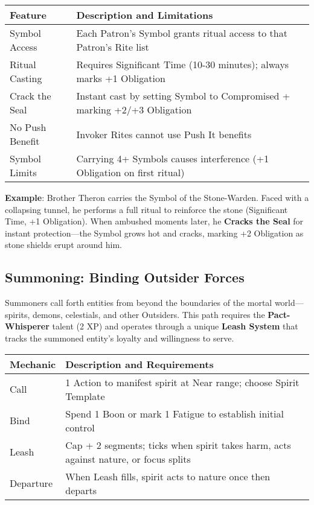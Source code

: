 \begin{fatebox}
\begin{tabularx}{\textwidth}{lX}
\toprule
\textbf{Feature} & \textbf{Description and Limitations} \\
\midrule
Symbol Access & Each Patron's Symbol grants ritual access to that Patron's Rite list \\
Ritual Casting & Requires Significant Time (10-30 minutes); always marks +1 Obligation \\
Crack the Seal & Instant cast by setting Symbol to Compromised + marking +2/+3 Obligation \\
No Push Benefit & Invoker Rites cannot use Push It benefits \\
Symbol Limits & Carrying 4+ Symbols causes interference (+1 Obligation on first ritual) \\
\bottomrule
\end{tabularx}
\end{fatebox}

\textbf{Example}: Brother Theron carries the Symbol of the Stone-Warden. Faced with a collapsing tunnel, he performs a full ritual to reinforce the stone (Significant Time, +1 Obligation). When ambushed moments later, he \textbf{Cracks the Seal} for instant protection—the Symbol grows hot and cracks, marking +2 Obligation as stone shields erupt around him.

\subsection*{Summoning: Binding Outsider Forces}

Summoners call forth entities from beyond the boundaries of the mortal world—spirits, demons, celestials, and other Outsiders. This path requires the \textbf{Pact-Whisperer} talent (2 XP) and operates through a unique \textbf{Leash System} that tracks the summoned entity's loyalty and willingness to serve.

\begin{fatebox}
\begin{tabularx}{\textwidth}{lX}
\toprule
\textbf{Mechanic} & \textbf{Description and Requirements} \\
\midrule
Call & 1 Action to manifest spirit at Near range; choose Spirit Template \\
Bind & Spend 1 Boon or mark 1 Fatigue to establish initial control \\
Leash & Cap + 2 segments; ticks when spirit takes harm, acts against nature, or focus splits \\
Departure & When Leash fills, spirit acts to nature once then departs \\
\bottomrule
\end{tabularx}
\end{fatebox}

